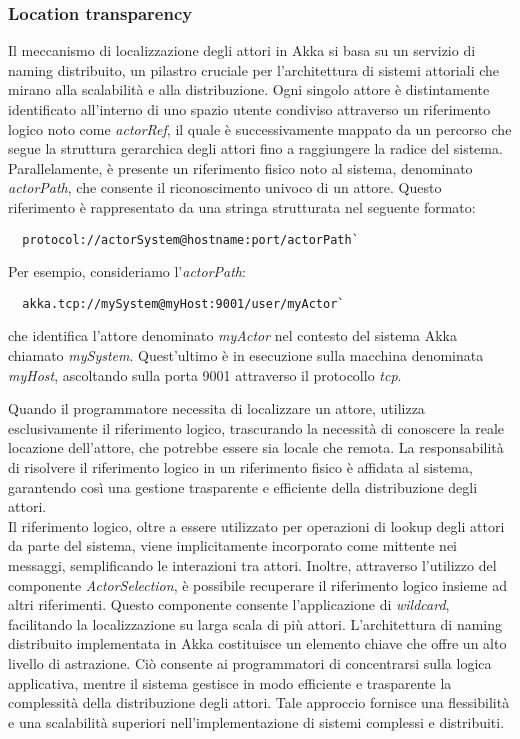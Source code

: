 \subsubsection[Location transparency]{Location transparency}
Il meccanismo di localizzazione degli attori in Akka si basa su un servizio di naming distribuito, un pilastro cruciale per l'architettura di sistemi attoriali che mirano alla scalabilità e alla distribuzione.
Ogni singolo attore è distintamente identificato all'interno di uno spazio utente condiviso attraverso un riferimento logico noto come \textit{actorRef}, il quale è successivamente mappato da un percorso che segue la struttura gerarchica degli attori fino a raggiungere la radice del sistema. \\
Parallelamente, è presente un riferimento fisico noto al sistema, denominato \textit{actorPath}, che consente il riconoscimento univoco di un attore.
Questo riferimento è rappresentato da una stringa strutturata nel seguente formato:
\begin{lstlisting}
  protocol://actorSystem@hostname:port/actorPath`  
\end{lstlisting}
Per esempio, consideriamo l'\textit{actorPath}:
\begin{lstlisting}
  akka.tcp://mySystem@myHost:9001/user/myActor`
\end{lstlisting}
che identifica l'attore denominato \textit{myActor} nel contesto del sistema Akka chiamato \textit{mySystem}.
Quest'ultimo è in esecuzione sulla macchina denominata \textit{myHost}, ascoltando sulla porta 9001 attraverso il protocollo \textit{tcp}. 

Quando il programmatore necessita di localizzare un attore, utilizza esclusivamente il riferimento logico, trascurando la necessità di conoscere la reale locazione dell'attore, che potrebbe essere sia locale che remota.
La responsabilità di risolvere il riferimento logico in un riferimento fisico è affidata al sistema, garantendo così una gestione trasparente e efficiente della distribuzione degli attori. \\
Il riferimento logico, oltre a essere utilizzato per operazioni di lookup degli attori da parte del sistema, viene implicitamente incorporato come mittente nei messaggi, semplificando le interazioni tra attori.
Inoltre, attraverso l'utilizzo del componente \textit{ActorSelection}, è possibile recuperare il riferimento logico insieme ad altri riferimenti.
Questo componente consente l'applicazione di \textit{wildcard}, facilitando la localizzazione su larga scala di più attori.
L'architettura di naming distribuito implementata in Akka costituisce un elemento chiave che offre un alto livello di astrazione.
Ciò consente ai programmatori di concentrarsi sulla logica applicativa, mentre il sistema gestisce in modo efficiente e trasparente la complessità della distribuzione degli attori.
Tale approccio fornisce una flessibilità e una scalabilità superiori nell'implementazione di sistemi complessi e distribuiti.


